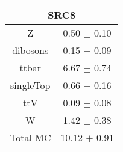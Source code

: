\begin{tabular}{c|c}
\hline\hline
\multicolumn{2}{c}{\bf SRC8 } \\ \hline 
Z & 0.50 $\pm$ 0.10 \\
dibosons & 0.15 $\pm$ 0.09 \\
ttbar & 6.67 $\pm$ 0.74 \\
singleTop & 0.66 $\pm$ 0.16 \\
ttV & 0.09 $\pm$ 0.08 \\
W & 1.42 $\pm$ 0.38 \\
\hline
Total MC & 10.12 $\pm$ 0.91 \\
\hline\hline
\end{tabular}
